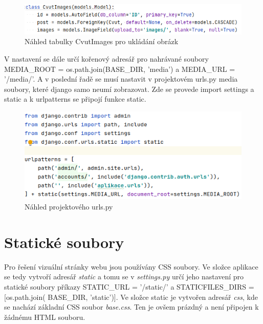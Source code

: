 \begin{figure}[H] \centering
    \includegraphics[width=430pt]{./pictures/9-db-cvutimages.PNG}
    \caption[Náhled tabulky CvutImages pro ukládání obrázků]{Náhled tabulky CvutImages pro ukládání obrázk}
	\label{fig:Náhled tabulky CvutImages pro ukládání obrázk}              
\end{figure}


V nastavení se dále určí kořenový adresář pro nahrávané soubory
MEDIA\_ROOT = os.path.join(BASE\_DIR, 'media') a
MEDIA\_URL = '/media/'.  A v poslední řadě se musí nastavit v
projektovém urls.py media soubory, které django samo neumí
zobrazovat. Zde se provede import settings a static a k urlpatterns se
připojí funkce static.

\begin{figure}[H] \centering
    \includegraphics[width=380pt]{./pictures/10-media-urlspy.PNG}
    \caption[Náhled projektového urls.py]{Náhled projektového urls.py}
	\label{fig:Náhled projektového urls.py}              
\end{figure}

\newpage

\section{Statické soubory}

Pro řešení vizuální stránky webu jsou používány CSS soubory. Ve složce
aplikace se tedy vytvoří adresář \emph{static} a tomu se v \emph{settings.py} 
určí jeho nastavení pro statické soubory příkazy STATIC\_URL =
  '/static/' a STATICFILES\_DIRS = [os.path.join( BASE\_DIR,
    'static')]. Ve složce static je vytvořen adresář \emph{css}, kde se
nachází základní CSS soubor \emph{base.css}. Ten je ovšem prázdný a není
připojen k žádnému HTML souboru.

